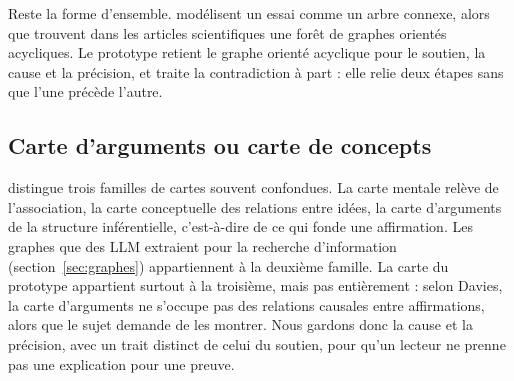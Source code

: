 Reste la forme d’ensemble. \textcite[620]{ref07} modélisent un essai comme un arbre connexe, alors que \textcite[43]{ref08} trouvent dans les articles scientifiques une forêt de graphes orientés acycliques. Le prototype retient le graphe orienté acyclique pour le soutien, la cause et la précision, et traite la contradiction à part : elle relie deux étapes sans que l’une précède l’autre.

\subsection{Carte d’arguments ou carte de concepts}

\textcite{ref26} distingue trois familles de cartes souvent confondues. La carte mentale relève de l’association, la carte conceptuelle des relations entre idées, la carte d’arguments de la structure inférentielle, c’est-à-dire de ce qui fonde une affirmation. Les graphes que des LLM extraient pour la recherche d’information (section~\ref{sec:graphes}) appartiennent à la deuxième famille. La carte du prototype appartient surtout à la troisième, mais pas entièrement : selon Davies, la carte d’arguments ne s’occupe pas des relations causales entre affirmations, alors que le sujet demande de les montrer. Nous gardons donc la cause et la précision, avec un trait distinct de celui du soutien, pour qu’un lecteur ne prenne pas une explication pour une preuve.
